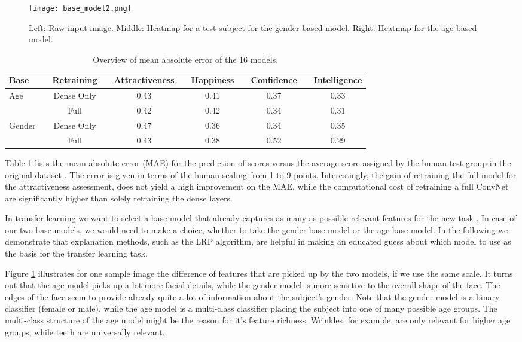 \documentclass[runningheads]{llncs}
\begin{document}
\begin{figure}[!htb]
\centering
\texttt{[image: base\_model2.png]}
\caption{
Left: Raw input image. Middle: Heatmap for a test-subject for the gender based model. Right: Heatmap for the age based model. 
}
\label{fig:base_model}
\end{figure}

\begin{table}[t]
\centering
\caption{Overview of mean absolute error of the 16 models.}
\begin{tabular}{lp{0.2cm}cp{0.2cm}cp{0.2cm}cp{0.2cm}cp{0.2cm}c}
Base       & & Retraining      & & Attractiveness & & Happiness & & Confidence & & Intelligence \\
\hline
Age & & Dense Only & & 0.43 & & 0.41 & & 0.37 & & 0.33  \\
    & & Full & & 0.42 & & 0.42 & & 0.34 & & 0.31  \\
\hline
Gender & & Dense Only & & 0.47 & & 0.36 & & 0.34 & & 0.35  \\
    & & Full  & & 0.43 & & 0.38 & & 0.52 & & 0.29 \\ 
\end{tabular}
\label{tab:mae}
\end{table}

Table \ref{tab:mae} lists the mean absolute error (MAE) for the prediction of scores versus the average score assigned by the human test group in the original dataset \cite{bainbridge2013intrinsic}. The error is given in terms of the human scaling from 1 to 9 points.
Interestingly, the gain of retraining the full model for the attractiveness assessment, does not yield a high improvement on the MAE, while the computational cost of retraining a full ConvNet are significantly higher than solely retraining the dense layers.

In transfer learning we want to select a base model that already captures as many as possible relevant features for the new task \cite{pan2010survey}. In case of our two base models, we would need to make a choice, whether to take the gender base model or the age base model. 
In the following we demonstrate that explanation methods, such as the LRP algorithm, are helpful in making an educated guess about which model to use as the basis for the transfer learning task.


Figure \ref{fig:base_model} illustrates for one sample image the difference of features that are picked up by the two models, if we use the same scale. It turns out that the age model picks up a lot more facial details, while the gender model is more sensitive to the overall shape of the face. The edges of the face seem to provide already quite a lot of information about the subject's gender. Note that the gender model is a binary classifier (female or male), while the age model is a multi-class classifier placing the subject into one of many possible age groups.
The multi-class structure of the age model might be the reason for it's feature richness. Wrinkles, for example, are only relevant for higher age groups, while teeth are universally relevant.
\end{document}
